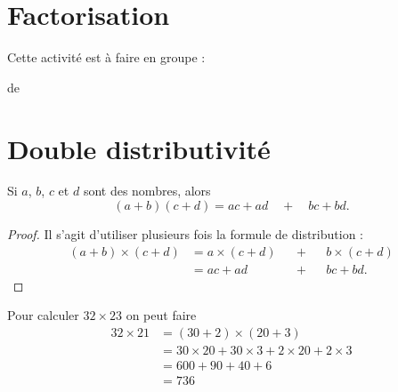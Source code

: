 

\section{Factorisation}



Cette activité est à faire en groupe :

de \cite{ZGRKooSUSPix}

\section{Double distributivité}

\begin{propriete}
    Si \( a\), \( b\), \( c\) et \( d\) sont des nombres, alors
    \begin{equation}
        (a+b)(c+d)=ac+ad\quad+\quad bc+bd.
    \end{equation}
\end{propriete}

\begin{proof}
    Il s'agit d'utiliser plusieurs fois la formule de distribution :
    \begin{subequations}
        \begin{align}
            (a+b)\times \boxed{(c+d)}&=a\times \boxed{(c+d)}&&+&& b\times \boxed{(c+d)}\\
            &=ac+ad  &&+&&bc+bd.
        \end{align}
    \end{subequations}
\end{proof}

\begin{example}
    Pour calculer \( 32\times 23 \) on peut faire
    \begin{subequations}
        \begin{align}
                32\times 21&=(30+2)\times (20+3)\\
                &=30\times 20+30\times 3+2\times 20+2\times 3\\
                &=600+90+40+6\\
                &=736
        \end{align}
    \end{subequations}
\end{example}


